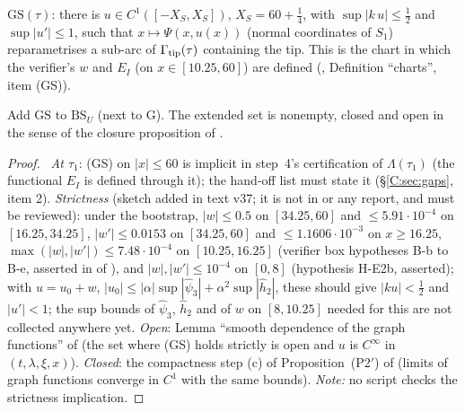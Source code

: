 \documentclass[11pt]{article}
\begin{document}
\begin{definition}\label{C:def:GS}
$\mathrm{GS}(\tau)$: there is $u\in C^1([-X_S,X_S])$, $X_S=60+\frac14$, with $\sup|k\,u|\le\frac12$ and $\sup|u'|\le1$, such that $x\mapsto\Psi(x,u(x))$ (normal coordinates of $S_1$) reparametrises a sub-arc of $\Gamma_{\rm tip}(\tau)$ containing the tip. This is the chart in which the verifier's $w$ and $E_I$ (on $x\in[10.25,60]$) are defined (, Definition ``charts'', item (GS)).
\end{definition}
\begin{lemma}\label{C:lem:GS}
Add $\mathrm{GS}$ to $\mathrm{BS}_U$ (next to G). The extended set is nonempty, closed and open in the sense of the closure proposition of .
\end{lemma}
\begin{proof}\tH\ \emph{At $\tau_1$}: (GS) on $|x|\le60$ is implicit in step~4's certification of $\Lambda(\tau_1)$ (the functional $E_I$ is defined through it); the hand-off list must state it (\S\ref{C:sec:gaps}, item 2). \emph{Strictness} (sketch added in text v37; it is not in  or any report, and must be reviewed): under the bootstrap, $|w|\le0.5$ on $[34.25,60]$ and $\le5.91\cdot10^{-4}$ on $[16.25,34.25]$, $|w'|\le0.0153$ on $[34.25,60]$ and $\le1.1606\cdot10^{-3}$ on $x\ge16.25$, $\max(|w|,|w'|)\le7.48\cdot10^{-4}$ on $[10.25,16.25]$ (verifier box hypotheses B-b to B-e, asserted in  of ), and $|w|,|w'|\le10^{-4}$ on $[0,8]$ (hypothesis H-E2b, asserted); with $u=u_0+w$, $|u_0|\le|\alpha|\sup|\hat\psi_3|+\alpha^2\sup|\hat h_2|$, these should give $|ku|<\frac12$ and $|u'|<1$; the sup bounds of $\hat\psi_3$, $\hat h_2$ and of $w$ on $[8,10.25]$ needed for this are not collected anywhere yet. \emph{Open}: Lemma ``smooth dependence of the graph functions'' of  (the set where (GS) holds strictly is open and $u$ is $C^\infty$ in $(t,\lambda,\xi,x)$). \emph{Closed}: the compactness step (c) of Proposition~(P2$'$) of  (limits of graph functions converge in $C^1$ with the same bounds). \emph{Note:} no script checks the strictness implication.
\end{proof}
\end{document}
